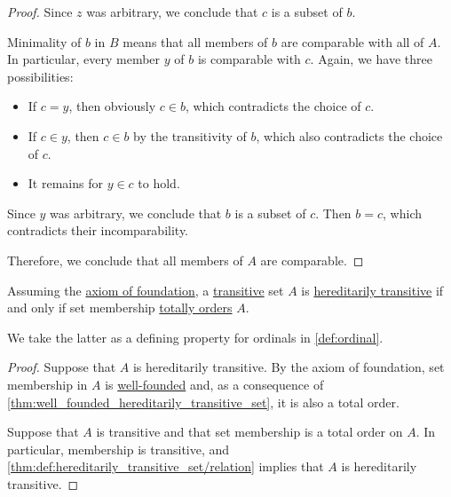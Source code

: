 \begin{proof}
  Since \( z \) was arbitrary, we conclude that \( c \) is a subset of \( b \).

  Minimality of \( b \) in \( B \) means that all members of \( b \) are comparable with all of \( A \). In particular, every member \( y \) of \( b \) is comparable with \( c \). Again, we have three possibilities:
  \begin{itemize}
    \item If \( c = y \), then obviously \( c \in b \), which contradicts the choice of \( c \).
    \item If \( c \in y \), then \( c \in b \) by the transitivity of \( b \), which also contradicts the choice of \( c \).
    \item It remains for \( y \in c \) to hold.
  \end{itemize}

  Since \( y \) was arbitrary, we conclude that \( b \) is a subset of \( c \). Then \( b = c \), which contradicts their incomparability.

  Therefore, we conclude that all members of \( A \) are comparable.
\end{proof}

\begin{corollary}\label{thm:hereditarily_transitive_set_with_foundation}
  Assuming the \hyperref[def:zfc/foundation]{axiom of foundation}, a \hyperref[def:transitive_set]{transitive} set \( A \) is \hyperref[def:hereditarily_transitive_set]{hereditarily transitive} if and only if set membership \hyperref[def:totally_ordered_set]{totally orders} \( A \).
\end{corollary}
\begin{comments}
  \item We take the latter as a defining property for ordinals in \cref{def:ordinal}.
\end{comments}
\begin{proof}
  \SufficiencySubProof Suppose that \( A \) is hereditarily transitive. By the axiom of foundation, set membership in \( A \) is \hyperref[def:well_founded_relation]{well-founded} and, as a consequence of \cref{thm:well_founded_hereditarily_transitive_set}, it is also a total order.

  \NecessitySubProof Suppose that \( A \) is transitive and that set membership is a total order on \( A \). In particular, membership is transitive, and \cref{thm:def:hereditarily_transitive_set/relation} implies that \( A \) is hereditarily transitive.
\end{proof}

